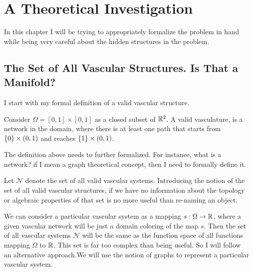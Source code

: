 \chapter{A Theoretical Investigation}

In this chapter I will be trying to appropriately formalize the problem in hand while being very careful about the hidden structures in the problem.



\section{The Set of All Vascular Structures. Is That a Manifold?}

I start with my formal definition of a valid vascular structure.
\begin{definition}
	Consider $ \Omega = [0,1] \times [0,1] $ as a closed subset of $ \mathbb{R}^2 $. A valid vasculature, is a network in the domain, where there is at least one path that starts from $ \{0\}\times (0,1) $ and reaches $ \{1\}\times (0,1) $.
\end{definition}
\begin{remark}
	The definition above needs to further formalized. For instance, what is a network? if I mean a graph theoretical concept, then I need to formally define it.
\end{remark}


Let $ \mathcal{N} $ denote the set of all valid vascular systems. Introducing the notion of the set of all valid vascular structures, if we have no information about the topology or algebraic properties of that set is no more useful than re-naming an object. 

We can consider a particular vascular system as a mapping $ s: \Omega \to \mathbb{R} $, where a given vascular network will be just a domain coloring of the map $ s $. Then the set of all vascular systems $ \mathcal{N} $ will be the same as the function space of all functions mapping $ \Omega $ to $ \mathbb{R} $. This set is far too complex than being useful. So I will follow an alternative approach.We will use the notion of graphs to represent a particular vascular system.

